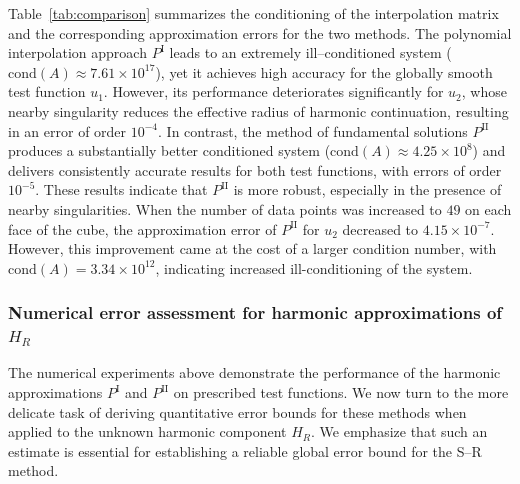 \documentclass[12pt,oneside,reqno]{amsart}%
\theoremstyle{plain}
\numberwithin{equation}{section}
\begin{document}
Table~\ref{tab:comparison} summarizes the conditioning of the
interpolation matrix and the corresponding approximation errors
for the two methods.
The polynomial interpolation approach $P^{\mathrm{I}}$
leads to an extremely ill--conditioned system
($\mathrm{cond}(A)\approx 7.61\times 10^{17}$),
yet it achieves high accuracy for the globally smooth test function $u_1$.
However, its performance deteriorates significantly for $u_2$,
whose nearby singularity reduces the effective radius of harmonic continuation,
resulting in an error of order $10^{-4}$.
In contrast, the method of fundamental solutions $P^{\mathrm{II}}$
produces a substantially better conditioned system
($\mathrm{cond}(A)\approx 4.25\times 10^{8}$)
and delivers consistently accurate results for both test functions,
with errors of order $10^{-5}$.
These results indicate that $P^{\mathrm{II}}$ is more robust, 
especially in the presence of nearby singularities. 
When the number of data points was increased to $49$ on each face of the cube, 
the approximation error of $P^{\mathrm{II}}$ for $u_2$ decreased to 
$4.15 \times 10^{-7}$. 
However, this improvement came at the cost of a larger 
condition number, with $\mathrm{cond}(A) = 3.34 \times 10^{12}$, 
indicating increased ill-conditioning of the system.

\subsubsection{Numerical error assessment for harmonic approximations of $H_R$}\label{ErrorTest}\hfill

The numerical experiments above demonstrate the performance of
the harmonic approximations $P^{\mathrm{I}}$ and $P^{\mathrm{II}}$
on prescribed test functions. We now turn to the more delicate task of deriving quantitative
error bounds for these methods when applied to the unknown
harmonic component $H_R$. We emphasize that such an estimate
is essential for establishing a reliable global error bound
for the S--R method.
\end{document}
